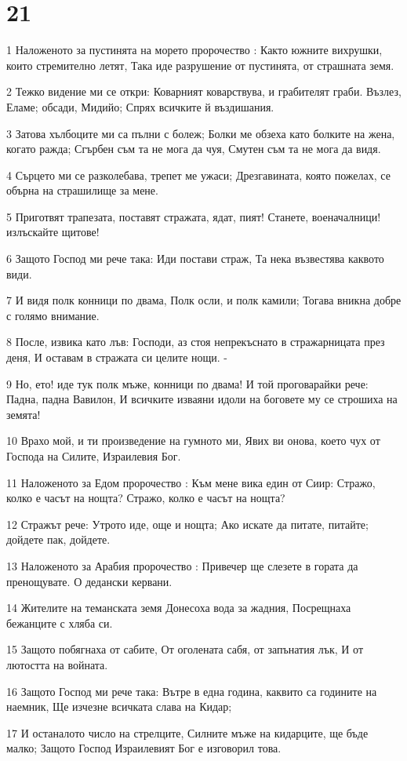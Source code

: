 \chapter{21}

\par 1 Наложеното за пустинята на морето пророчество : Както южните вихрушки, които стремително летят, Така иде разрушение от пустинята, от страшната земя.
\par 2 Тежко видение ми се откри: Коварният коварствува, и грабителят граби. Възлез, Еламе; обсади, Мидийо; Спрях всичките й въздишания.
\par 3 Затова хълбоците ми са пълни с болеж; Болки ме обзеха като болките на жена, когато ражда; Сгърбен съм та не мога да чуя, Смутен съм та не мога да видя.
\par 4 Сърцето ми се разколебава, трепет ме ужаси; Дрезгавината, която пожелах, се обърна на страшилище за мене.
\par 5 Приготвят трапезата, поставят стражата, ядат, пият! Станете, военачалници! излъскайте щитове!
\par 6 Защото Господ ми рече така: Иди постави страж, Та нека възвестява каквото види.
\par 7 И видя полк конници по двама, Полк осли, и полк камили; Тогава вникна добре с голямо внимание.
\par 8 После, извика като лъв: Господи, аз стоя непрекъснато в стражарницата през деня, И оставам в стражата си целите нощи. -
\par 9 Но, ето! иде тук полк мъже, конници по двама! И той проговарайки рече: Падна, падна Вавилон, И всичките изваяни идоли на боговете му се строшиха на земята!
\par 10 Врахо мой, и ти произведение на гумното ми, Явих ви онова, което чух от Господа на Силите, Израилевия Бог.
\par 11 Наложеното за Едом пророчество : Към мене вика един от Сиир: Стражо, колко е часът на нощта? Стражо, колко е часът на нощта?
\par 12 Стражът рече: Утрото иде, още и нощта; Ако искате да питате, питайте; дойдете пак, дойдете.
\par 13 Наложеното за Арабия пророчество : Привечер ще слезете в гората да пренощувате. О дедански кервани.
\par 14 Жителите на теманската земя Донесоха вода за жадния, Посрещнаха бежанците с хляба си.
\par 15 Защото побягнаха от сабите, От оголената сабя, от запънатия лък, И от лютостта на войната.
\par 16 Защото Господ ми рече така: Вътре в една година, каквито са годините на наемник, Ще изчезне всичката слава на Кидар;
\par 17 И останалото число на стрелците, Силните мъже на кидарците, ще бъде малко; Защото Господ Израилевият Бог е изговорил това.

